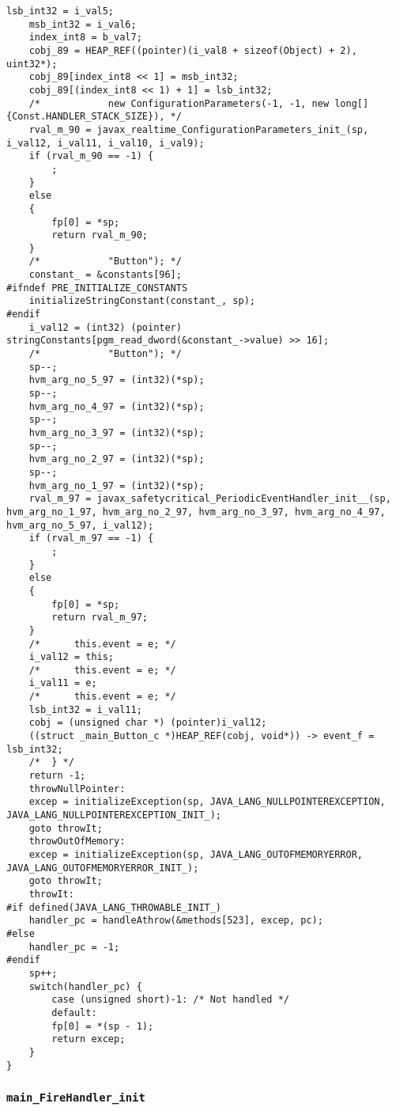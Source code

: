 \begin{lstlisting}[firstnumber=54496]
	lsb_int32 = i_val5;
	msb_int32 = i_val6;
	index_int8 = b_val7;
	cobj_89 = HEAP_REF((pointer)(i_val8 + sizeof(Object) + 2), uint32*);
	cobj_89[index_int8 << 1] = msb_int32;
	cobj_89[(index_int8 << 1) + 1] = lsb_int32;
	/*			  new ConfigurationParameters(-1, -1, new long[] {Const.HANDLER_STACK_SIZE}), */
	rval_m_90 = javax_realtime_ConfigurationParameters_init_(sp, i_val12, i_val11, i_val10, i_val9);
	if (rval_m_90 == -1) {
		;
	}
	else
	{
		fp[0] = *sp;
		return rval_m_90;
	}
	/*			  "Button"); */
	constant_ = &constants[96];
#ifndef PRE_INITIALIZE_CONSTANTS
	initializeStringConstant(constant_, sp);
#endif
	i_val12 = (int32) (pointer) stringConstants[pgm_read_dword(&constant_->value) >> 16];
	/*			  "Button"); */
	sp--;
	hvm_arg_no_5_97 = (int32)(*sp);
	sp--;
	hvm_arg_no_4_97 = (int32)(*sp);
	sp--;
	hvm_arg_no_3_97 = (int32)(*sp);
	sp--;
	hvm_arg_no_2_97 = (int32)(*sp);
	sp--;
	hvm_arg_no_1_97 = (int32)(*sp);
	rval_m_97 = javax_safetycritical_PeriodicEventHandler_init__(sp, hvm_arg_no_1_97, hvm_arg_no_2_97, hvm_arg_no_3_97, hvm_arg_no_4_97, hvm_arg_no_5_97, i_val12);
	if (rval_m_97 == -1) {
		;
	}
	else
	{
		fp[0] = *sp;
		return rval_m_97;
	}
	/*		this.event = e; */
	i_val12 = this;
	/*		this.event = e; */
	i_val11 = e;
	/*		this.event = e; */
	lsb_int32 = i_val11;
	cobj = (unsigned char *) (pointer)i_val12;
	((struct _main_Button_c *)HEAP_REF(cobj, void*)) -> event_f = lsb_int32;
	/*	} */
	return -1;
	throwNullPointer:
	excep = initializeException(sp, JAVA_LANG_NULLPOINTEREXCEPTION, JAVA_LANG_NULLPOINTEREXCEPTION_INIT_);
	goto throwIt;
	throwOutOfMemory:
	excep = initializeException(sp, JAVA_LANG_OUTOFMEMORYERROR, JAVA_LANG_OUTOFMEMORYERROR_INIT_);
	goto throwIt;
	throwIt:
#if defined(JAVA_LANG_THROWABLE_INIT_)
	handler_pc = handleAthrow(&methods[523], excep, pc);
#else
	handler_pc = -1;
#endif
	sp++;
	switch(handler_pc) {
		case (unsigned short)-1: /* Not handled */
		default:
		fp[0] = *(sp - 1);
		return excep;
	}
}
\end{lstlisting}


\subsubsection{\texttt{main\_FireHandler\_init}}

